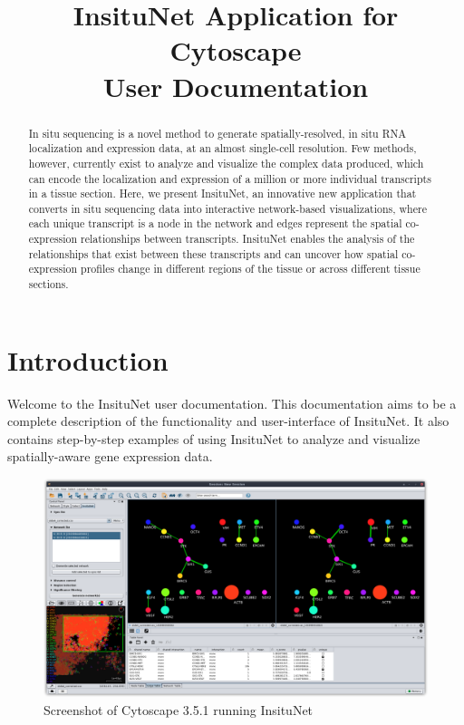 \documentclass[a4paper,12pt]{article}
\title{InsituNet Application for Cytoscape \\ \large User Documentation}
\begin{document}
\maketitle
\begin{abstract}
In situ sequencing is a novel method to generate spatially-resolved, in situ RNA localization and expression data, at an almost single-cell resolution. Few methods, however, currently exist to analyze and visualize the complex data produced, which can encode the localization and expression of a million or more individual transcripts in a tissue section. Here, we present InsituNet, an innovative new application that converts in situ sequencing data into interactive network-based visualizations, where each unique transcript is a node in the network and edges represent the spatial co-expression relationships between transcripts. InsituNet enables the analysis of the relationships that exist between these transcripts and can uncover how spatial co-expression profiles change in different regions of the tissue or across different tissue sections. 
\end{abstract}
\clearpage

\tableofcontents

\clearpage

\section{Introduction}
Welcome to the InsituNet user documentation. This documentation aims to be a complete description of the functionality and user-interface of InsituNet. It also contains step-by-step examples of using InsituNet to analyze and visualize spatially-aware gene expression data.

\begin{figure}[htb]
	\caption{Screenshot of Cytoscape 3.5.1 running InsituNet}\label{fig:shot}
	\centering
	\includegraphics[width=\textwidth]{shot_1-shadow}
\end{figure}
\end{document}
